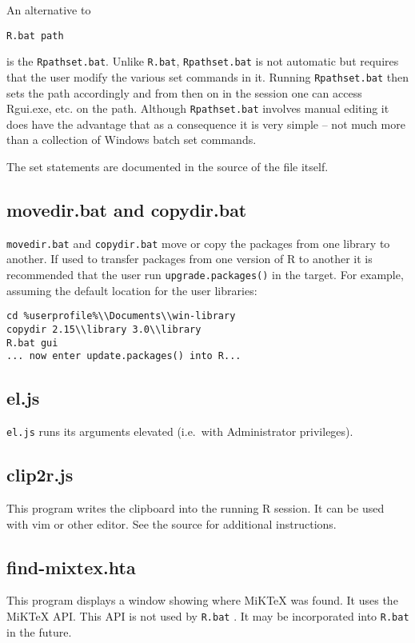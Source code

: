 An alternative to

\begin{verbatim}
R.bat path 
\end{verbatim}

is the \texttt{Rpathset.bat}. Unlike \texttt{R.bat},
\texttt{Rpathset.bat} is not automatic but requires that the user modify
the various set commands in it. Running \texttt{Rpathset.bat} then sets
the path accordingly and from then on in the session one can access
Rgui.exe, etc. on the path. Although \texttt{Rpathset.bat} involves
manual editing it does have the advantage that as a consequence it is
very simple -- not much more than a collection of Windows batch set
commands.

The set statements are documented in the source of the file itself.

\subsection{movedir.bat and copydir.bat}

\texttt{movedir.bat} and \texttt{copydir.bat} move or copy the packages
from one library to another. If used to transfer packages from one
version of R to another it is recommended that the user run
\texttt{upgrade.packages()} in the target. For example, assuming the
default location for the user libraries:

\begin{verbatim}
cd %userprofile%\\Documents\\win-library
copydir 2.15\\library 3.0\\library
R.bat gui 
... now enter update.packages() into R...
\end{verbatim}

\subsection{el.js}

\texttt{el.js} runs its arguments elevated (i.e.~with Administrator
privileges).

\subsection{clip2r.js}

This program writes the clipboard into the running R session. It can be
used with vim or other editor. See the source for additional
instructions.

\subsection{find-mixtex.hta}

This program displays a window showing where MiKTeX was found. It uses
the MiKTeX API. This API is not used by \texttt{R.bat} . It may be
incorporated into \texttt{R.bat} in the future.
